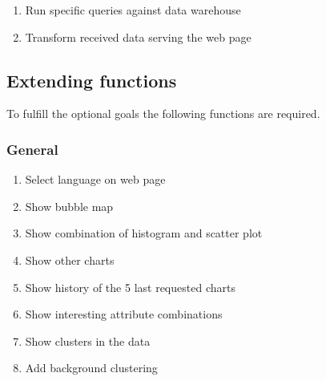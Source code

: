 \begin{enumerate}[resume*=func]
  
  \item Run specific queries against \gls{data warehouse} \label{f20}
  
  \item Transform received data serving the web page \label{f21}

\end{enumerate}


\subsection{Extending functions}

To fulfill the optional goals the following functions are required.

\subsubsection*{General}
\begin{enumerate}[resume*=func]
  
  \item Select language on web page \label{f22}
  
  \item Show bubble map \label{f23} %
  
  \item Show combination of \gls{histogram} and \gls{scatter plot} \label{f24}
  
  \item Show other \glspl{chart} \label{f25}
  
  \item Show history of the 5 last requested \glspl{chart}  \label{f26}
  \item Show interesting attribute combinations

  \item Show clusters in the data
  
  \item Add background clustering
  


 
\end{enumerate}


